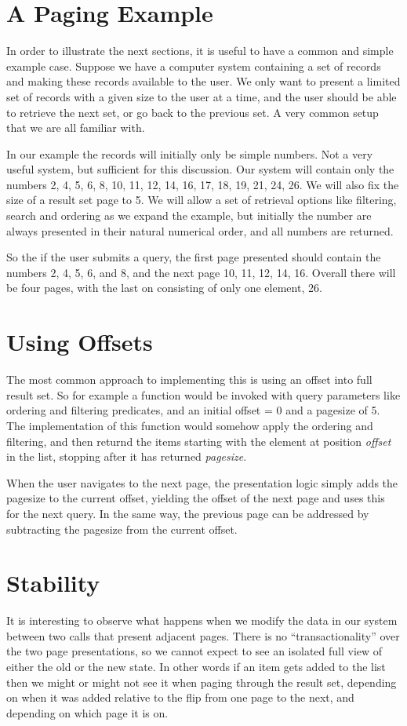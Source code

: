 \documentclass[11pt,a4paper]{article}
\begin{document}
\begin{multicols}{2}
\section*{A Paging Example}
In order to illustrate the next sections, it is useful to have a common and
simple example case. Suppose we have a computer system containing a set of
records and making these records available to the user. We only want to present
a limited set of records with a given size to the user at a time, and the user 
should be able to retrieve the next set, or go back to the previous set. A very
common setup that we are all familiar with.

In our example the records will initially only be simple numbers. Not a very
useful system, but sufficient for this discussion. Our system will contain only
the numbers 2, 4, 5, 6, 8, 10, 11, 12, 14, 16, 17, 18, 19, 21, 24, 26. We will
also fix the size of a result set page to 5. We will allow a set of retrieval
options like filtering, search and ordering as we expand the example, but
initially the number are always presented in their natural numerical order, and
all numbers are returned. 

So the if the user submits a query, the first page presented should contain the
numbers 2, 4, 5, 6, and 8, and the next page 10, 11, 12, 14, 16. Overall there
will be four pages, with the last on consisting of only one element, 26. 

\section*{Using Offsets}
The most common approach to implementing this is using an offset into full
result set. So for example a function would be invoked with query parameters
like ordering and filtering predicates, and an initial offset = 0 and a
pagesize of 5. The implementation of this function would somehow apply the
ordering and filtering, and then returnd the items starting with the element at
position {\em offset} in the list, stopping after it has returned {\em
pagesize}. 

When the user navigates to the next page, the presentation logic simply adds the
pagesize to the current offset, yielding the offset of the next page and uses
this for the next query. In the same way, the previous page can be addressed by
subtracting the pagesize from the current offset. 

\section*{Stability}
It is interesting to observe what happens when we modify the data in our system
between two calls that present adjacent pages. There is no ``transactionality''
over the two page presentations, so we cannot expect to see an isolated full
view of either the old or the new state. In other words if an item gets added to
the list then we might or might not see it when paging through the result set,
depending on when it was added relative to the flip from one page to the next,
and depending on which page it is on. 


\end{multicols}
\end{document}

